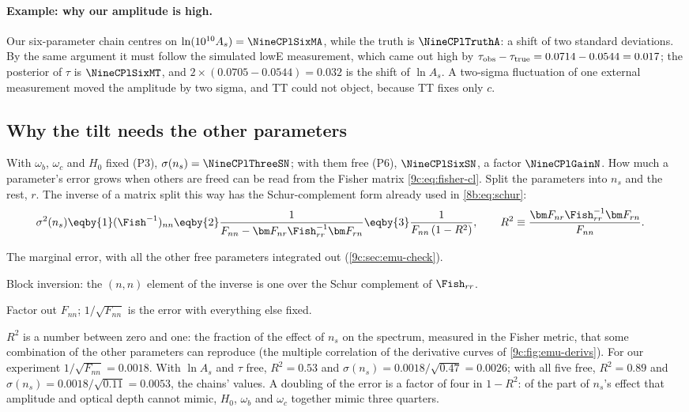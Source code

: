 \paragraph{Example: why our amplitude is high.} Our six-parameter chain centres on
$\ln(10^{10}A_s)=\NineCPlSixMA$, while the truth is $\NineCPlTruthA$: a shift of two standard deviations. By the same
argument it must follow the simulated lowE measurement, which came out high by $\tau_{\rm obs}-\tau_{\rm true}=0.0714-0.0544=0.017$;
the posterior of $\tau$ is $\NineCPlSixMT$, and $2\times(0.0705-0.0544)=0.032$ is the shift of $\ln A_s$. A two-sigma
fluctuation of one external measurement moved the amplitude by two sigma, and TT could not object, because TT
fixes only $c$.

\subsection{Why the tilt needs the other parameters}
\label{9c:sec:planck-ns}

With $\omega_b$, $\omega_c$ and $H_0$ fixed (P3), $\sigma(n_s)=\NineCPlThreeSN$; with them free (P6), $\NineCPlSixSN$, a factor
$\NineCPlGainN$. How
much a parameter's error grows when others are freed can be read from the Fisher matrix
\eqref{9c:eq:fisher-cl}. Split the parameters into $n_s$ and the rest, $r$. The inverse of a matrix split this way has
the Schur-complement form already used in \eqref{8b:eq:schur}:
\begin{align}
  \sigma^2(n_s)
  &\eqby{1}(\Fish^{-1})_{nn}
   \eqby{2}\frac{1}{F_{nn}-\bm F_{nr}\Fish_{rr}^{-1}\bm F_{rn}}
   \eqby{3}\frac{1}{F_{nn}\,(1-R^2)},
  \qquad R^2\equiv\frac{\bm F_{nr}\Fish_{rr}^{-1}\bm F_{rn}}{F_{nn}} .
  \label{9c:eq:ns-R2}
\end{align}
\begin{explain}
  \item The marginal error, with all the other free parameters integrated out (\cref{9c:sec:emu-check}).
  \item Block inversion: the $(n,n)$ element of the inverse is one over the Schur complement of $\Fish_{rr}$.
  \item Factor out $F_{nn}$; $1/\sqrt{F_{nn}}$ is the error with everything else fixed.
\end{explain}
$R^2$ is a number between zero and one: the fraction of the effect of $n_s$ on the spectrum, measured in the Fisher
metric, that some combination of the other parameters can reproduce (the multiple correlation of the derivative
curves of \cref{9c:fig:emu-derivs}). For our experiment $1/\sqrt{F_{nn}}=0.0018$. With $\ln A_s$ and $\tau$ free,
$R^2=0.53$ and $\sigma(n_s)=0.0018/\sqrt{0.47}=0.0026$; with all five free, $R^2=0.89$ and
$\sigma(n_s)=0.0018/\sqrt{0.11}=0.0053$, the chains' values. A doubling of the error is a factor of four in $1-R^2$:
of the part of $n_s$'s effect that amplitude and optical depth cannot mimic, $H_0$, $\omega_b$ and $\omega_c$ together
mimic three quarters.

